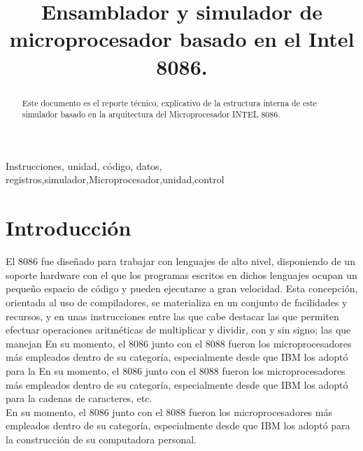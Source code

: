 \documentclass[conference]{IEEEtran}
\begin{document}
\renewcommand\IEEEkeywordsname{Palabras clave}

{\footnotesize 
\title{Ensamblador y simulador de microprocesador basado en el Intel 8086.}
}

\author{
\and
{}
\and
{}
}

\maketitle

\begin{abstract}
Este documento es el reporte técnico, explicativo de la estructura interna de este simulador basado en la arquitectura del Microprocesador INTEL 8086.
\end{abstract}

\begin{IEEEkeywords}
Instrucciones, unidad, código, datos, registros,simulador,Microprocesador,unidad,control
\end{IEEEkeywords}

\section{Introducción}
El 8086 fue diseñado para trabajar con lenguajes de alto nivel, disponiendo de un
soporte hardware con el que los programas escritos en dichos lenguajes ocupan un
pequeño espacio de código y pueden ejecutarse a gran velocidad. Esta concepción,
orientada al uso de compiladores, se materializa en un conjunto de facilidades y
recursos, y en unas instrucciones entre las que cabe destacar las que permiten efectuar
operaciones aritméticas de multiplicar y dividir, con y sin signo; las que manejan
En su momento, el 8086 junto con el 8088 fueron los microprocesadores más
empleados dentro de su categoría, especialmente desde que IBM los adoptó para la
En su momento, el 8086 junto con el 8088 fueron los microprocesadores más
empleados dentro de su categoría, especialmente desde que IBM los adoptó para la
cadenas de caracteres, etc.\\
En su momento, el 8086 junto con el 8088 fueron los microprocesadores más
empleados dentro de su categoría, especialmente desde que IBM los adoptó para la
construcción de su computadora personal.
\end{document}
